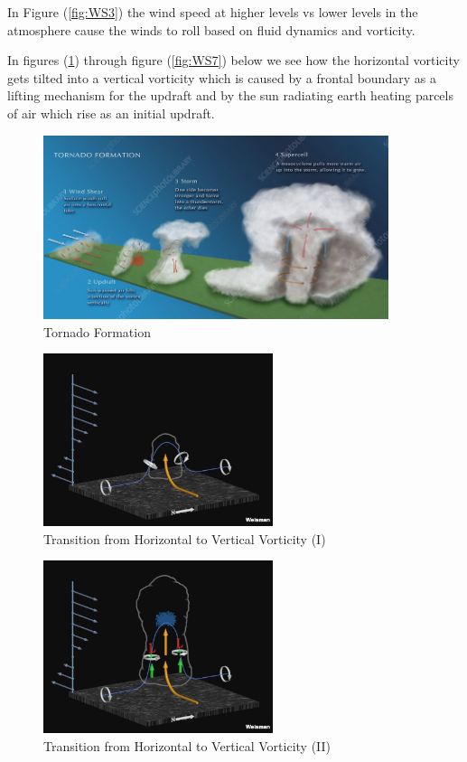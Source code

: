 \documentclass[12pt]{report}
\begin{document}
In Figure (\ref{fig:WS3}) the wind speed at higher levels vs lower levels in the atmosphere cause the winds to roll based on fluid dynamics and vorticity. 

In figures (\ref{fig:WS4}) through figure (\ref{fig:WS7}) below we see how the horizontal vorticity gets tilted into a vertical vorticity which is caused by a frontal boundary as a lifting mechanism for the updraft and by the sun radiating earth heating parcels of air which rise as an initial updraft.

\begin{figure}[H]
    \centering
    \includegraphics[width=0.9\textwidth]{Weather pics/WS4.jpg}
    \caption{Tornado Formation} \label{fig:WS4}
\end{figure}
\noindent

\begin{figure}[H]
    \centering
    \includegraphics[width=0.6\textwidth]{Weather pics/WS5.jpg}
    \caption{Transition from Horizontal to Vertical Vorticity (I)} \label{fig:WS5}
\end{figure}
\noindent

\begin{figure}[H]
    \centering
    \includegraphics[width=0.6\textwidth]{Weather pics/WS6.jpg}
    \caption{Transition from Horizontal to Vertical Vorticity (II)} \label{fig:WS6}
\end{figure}
\noindent
\end{document}
